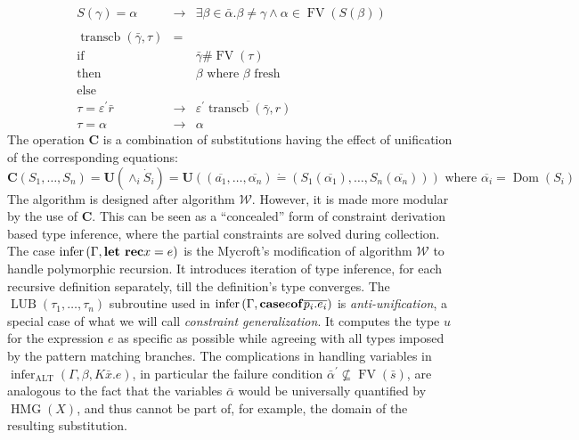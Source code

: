 \documentclass{article}
\newcommand{\tmem}[1]{{\em #1\/}}
\newcommand{\tmmathbf}[1]{\ensuremath{\boldsymbol{#1}}}
\newcommand{\tmop}[1]{\ensuremath{\operatorname{#1}}}
\newcommand{\tmstrong}[1]{\textbf{#1}}
\begin{document}
\begin{eqnarray*}
  S (\gamma) = \alpha & \rightarrow & \exists \beta \in \bar{\alpha} . \beta
  \neq \gamma \wedge \alpha \in \tmop{FV} (S (\beta))\\
  &  & \\
  \tmop{transcb} (\bar{\gamma}, \tau) & = & \\
  \text{if} &  & \bar{\gamma} \# \tmop{FV} (\tau)\\
  \text{then} &  & \beta \text{ where } \beta \text{ fresh}\\
  \text{else} &  & \\
  \tau = \varepsilon^{\prime}  \bar{r} & \rightarrow & \varepsilon^{\prime} 
  \overline{\tmop{transcb} (\bar{\gamma}, r)}\\
  \tau = \alpha & \rightarrow & \alpha
\end{eqnarray*}
The operation $\tmmathbf{C}$ is a combination of substitutions having the
effect of unification of the corresponding equations:
\[ \tmmathbf{C} (S_1, \ldots, S_n) =\tmmathbf{U} (\wedge_i \dot{S}_i)
   =\tmmathbf{U} ((\overline{a_1}, \ldots, \overline{\alpha_n}) \dot{=} (S_1
   (\overline{\alpha_1}), \ldots, S_n (\overline{\alpha_n}))) \text{ where }
   \overline{\alpha_i} = \tmop{Dom} (S_i) \]
The algorithm is designed after algorithm $\mathcal{W}$. However, it is made
more modular by the use of $\tmmathbf{C}$. This can be seen as a ``concealed''
form of constraint derivation based type inference, where the partial
constraints are solved during collection. The case $\tmop{infer} \left(
\Gamma, \text{{\tmstrong{let rec}}} x = e \right)$ is the Mycroft's
modification of algorithm $\mathcal{W}$ to handle polymorphic recursion. It
introduces iteration of type inference, for each recursive definition
separately, till the definition's type converges. The $\tmop{LUB} (\tau_1,
\ldots, \tau_n)$ subroutine used in $\tmop{infer} \left( \Gamma, {\nobreak}
\tmmathbf{\tmop{case}} e \tmmathbf{\tmop{of}}  \overline{p_i .e_i} \right)$ is
{\tmem{anti-unification}}, a special case of what we will call
{\tmem{constraint generalization}}. It computes the type $u$ for the
expression $e$ as specific as possible while agreeing with all types imposed
by the pattern matching branches. The complications in handling variables in
$\tmop{infer}_{\tmop{ALT}} (\Gamma, \beta, K \bar{x} .e)$, in particular the
failure condition $\bar{\alpha}^{\prime} \nsubseteq \tmop{FV} (\bar{s})$, are
analogous to the fact that the variables $\bar{\alpha}$ would be universally
quantified by $\tmop{HMG} (X)$, and thus cannot be part of, for example, the
domain of the resulting substitution.
\end{document}
